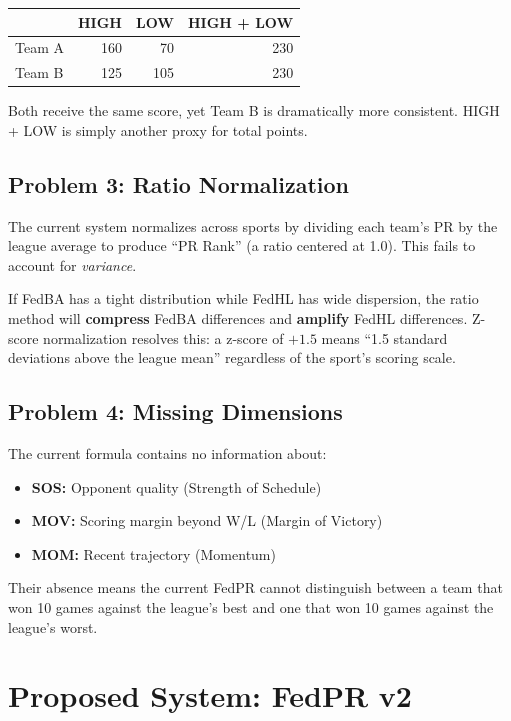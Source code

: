 \documentclass[11pt,a4paper]{article}
\begin{document}
\begin{table}[H]
\centering
\begin{tabular}{@{}lrrr@{}}
\toprule
& \textbf{HIGH} & \textbf{LOW} & \textbf{HIGH + LOW}\\
\midrule
Team A & 160 & 70 & 230\\
Team B & 125 & 105 & 230\\
\bottomrule
\end{tabular}
\end{table}

Both receive the same score, yet Team B is dramatically more consistent. HIGH + LOW is simply another proxy for total points.

\subsection{Problem 3: Ratio Normalization}

The current system normalizes across sports by dividing each team's PR by the league average to produce ``PR Rank'' (a ratio centered at 1.0). This fails to account for \emph{variance}.

If FedBA has a tight distribution while FedHL has wide dispersion, the ratio method will \textbf{compress} FedBA differences and \textbf{amplify} FedHL differences. Z-score normalization resolves this: a z-score of $+1.5$ means ``1.5 standard deviations above the league mean'' regardless of the sport's scoring scale.

\subsection{Problem 4: Missing Dimensions}

The current formula contains no information about:
\begin{itemize}[nosep]
\item \textbf{SOS:} Opponent quality (Strength of Schedule)
\item \textbf{MOV:} Scoring margin beyond W/L (Margin of Victory)
\item \textbf{MOM:} Recent trajectory (Momentum)
\end{itemize}
Their absence means the current FedPR cannot distinguish between a team that won 10 games against the league's best and one that won 10 games against the league's worst.


\section{Proposed System: FedPR v2}
\end{document}

